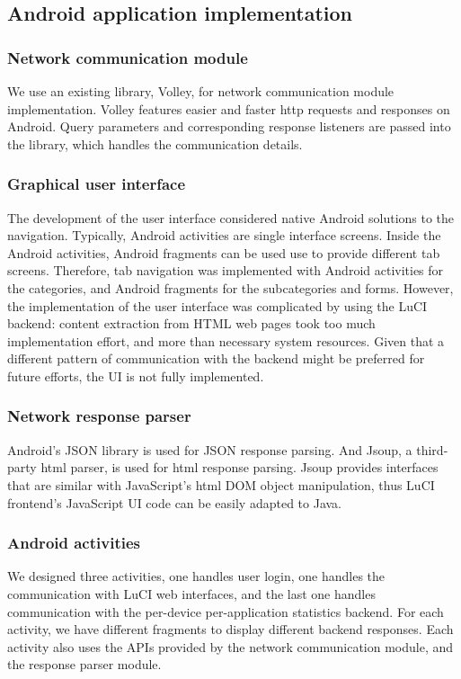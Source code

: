 \subsection{Android application implementation}

\subsubsection{Network communication module}

We use an existing library, Volley, for network communication module implementation. Volley features easier and faster http requests and responses on Android. Query parameters and corresponding response listeners are passed into the library, which handles the communication details.

\subsubsection{Graphical user interface}

The development of the user interface considered native Android solutions to the navigation. Typically, Android activities are single interface screens. Inside the Android activities, Android fragments can be used use to provide different tab screens. Therefore, tab navigation was implemented with Android activities for the categories, and Android fragments for the subcategories and forms. However, the implementation of the user interface was complicated by using the LuCI backend: content extraction from HTML web pages took too much implementation effort, and more than necessary system resources. Given that a different pattern of communication with the backend might be preferred for future efforts, the UI is not fully implemented.

\subsubsection{Network response parser}

Android's JSON library is used for JSON response parsing. And Jsoup, a third-party html parser, is used for html response parsing. Jsoup provides interfaces that are similar with JavaScript's html DOM object manipulation, thus LuCI frontend's JavaScript UI code can be easily adapted to Java.

\subsubsection{Android activities}

We designed three activities, one handles user login, one handles the communication with LuCI web interfaces, and the last one handles communication with the per-device per-application statistics backend. For each activity, we have different fragments to display different backend responses. Each activity also uses the APIs provided by the network communication module, and the response parser module.